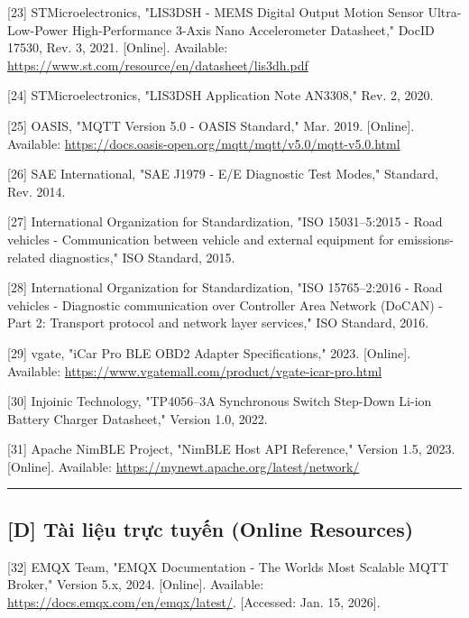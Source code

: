 \documentclass[13pt,a4paper]{extarticle}
\renewcommand{\\}{\thesislongtableorignewline\hline}%
\begin{document}
{[}23{]} STMicroelectronics, "LIS3DSH - MEMS Digital Output Motion
Sensor Ultra-Low-Power High-Performance 3-Axis
\textquotesingle Nano\textquotesingle{} Accelerometer Datasheet," DocID
17530, Rev. 3, 2021. {[}Online{]}. Available:
\url{https://www.st.com/resource/en/datasheet/lis3dh.pdf}

{[}24{]} STMicroelectronics, "LIS3DSH Application Note AN3308," Rev. 2,
2020.

{[}25{]} OASIS, "MQTT Version 5.0 - OASIS Standard," Mar. 2019.
{[}Online{]}. Available:
\url{https://docs.oasis-open.org/mqtt/mqtt/v5.0/mqtt-v5.0.html}

{[}26{]} SAE International, "SAE J1979 - E/E Diagnostic Test Modes,"
Standard, Rev. 2014.

{[}27{]} International Organization for Standardization, "ISO
15031--5:2015 - Road vehicles - Communication between vehicle and
external equipment for emissions-related diagnostics," ISO Standard,
2015.

{[}28{]} International Organization for Standardization, "ISO
15765--2:2016 - Road vehicles - Diagnostic communication over Controller
Area Network (DoCAN) - Part 2: Transport protocol and network layer
services," ISO Standard, 2016.

{[}29{]} vgate, "iCar Pro BLE OBD2 Adapter Specifications," 2023.
{[}Online{]}. Available:
\url{https://www.vgatemall.com/product/vgate-icar-pro.html}

{[}30{]} Injoinic Technology, "TP4056--3A Synchronous Switch Step-Down
Li-ion Battery Charger Datasheet," Version 1.0, 2022.

{[}31{]} Apache NimBLE Project, "NimBLE Host API Reference," Version
1.5, 2023. {[}Online{]}. Available:
\url{https://mynewt.apache.org/latest/network/}

\begin{center}\rule{0.5\linewidth}{0.5pt}\end{center}

\subsection{{[}D{]} Tài liệu trực tuyến (Online
Resources)}\label{d-tuxe0i-liux1ec7u-trux1ef1c-tuyux1ebfn-online-resources}

{[}32{]} EMQX Team, "EMQX Documentation - The World\textquotesingle s
Most Scalable MQTT Broker," Version 5.x, 2024. {[}Online{]}. Available:
\url{https://docs.emqx.com/en/emqx/latest/}. {[}Accessed: Jan. 15,
2026{]}.
\end{document}
